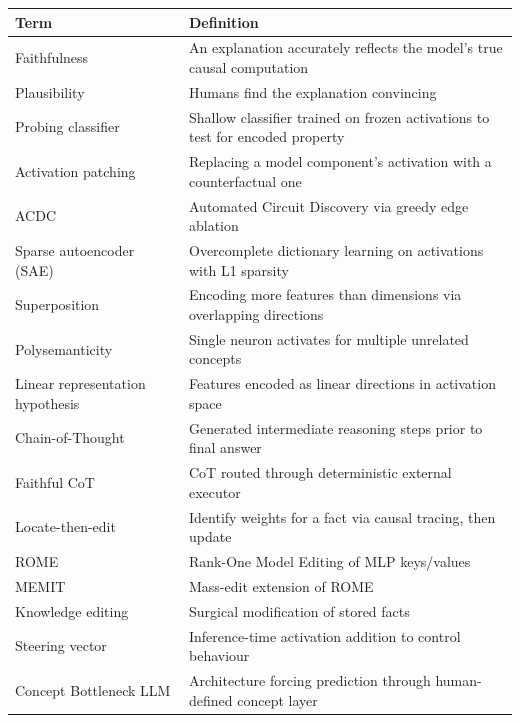 {\def\LTcaptype{none} %
\begin{longtable}[]{@{}
  >{\raggedright\arraybackslash}p{}
  >{\raggedright\arraybackslash}p{}@{}}
\toprule\noalign{}
\begin{minipage}[b]{\linewidth}\raggedright
Term
\end{minipage} & \begin{minipage}[b]{\linewidth}\raggedright
Definition
\end{minipage} \\
\midrule\noalign{}
\endhead
\bottomrule\noalign{}
\endlastfoot
Faithfulness & An explanation accurately reflects the model's true causal computation \\
Plausibility & Humans find the explanation convincing \\
Probing classifier & Shallow classifier trained on frozen activations to test for encoded property \\
Activation patching & Replacing a model component's activation with a counterfactual one \\
ACDC & Automated Circuit Discovery via greedy edge ablation \\
Sparse autoencoder (SAE) & Overcomplete dictionary learning on activations with L1 sparsity \\
Superposition & Encoding more features than dimensions via overlapping directions \\
Polysemanticity & Single neuron activates for multiple unrelated concepts \\
Linear representation hypothesis & Features encoded as linear directions in activation space \\
Chain-of-Thought & Generated intermediate reasoning steps prior to final answer \\
Faithful CoT & CoT routed through deterministic external executor \\
Locate-then-edit & Identify weights for a fact via causal tracing, then update \\
ROME & Rank-One Model Editing of MLP keys/values \\
MEMIT & Mass-edit extension of ROME \\
Knowledge editing & Surgical modification of stored facts \\
Steering vector & Inference-time activation addition to control behaviour \\
Concept Bottleneck LLM & Architecture forcing prediction through human-defined concept layer \\

\end{longtable}}
